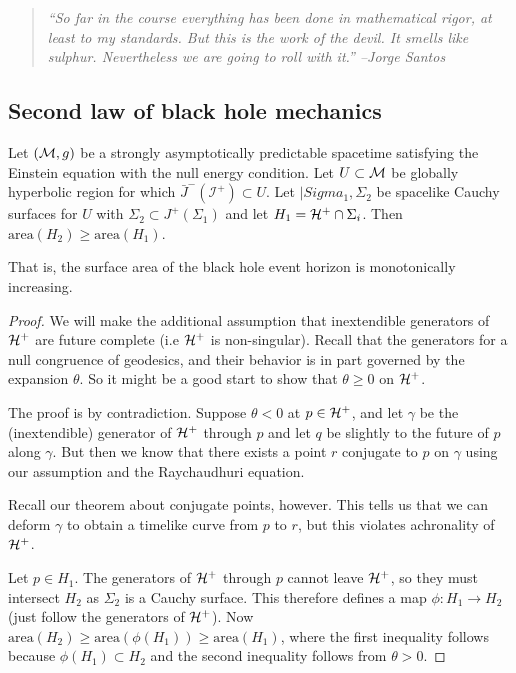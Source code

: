\begin{quote}
    \textit{``So far in the course everything has been done in mathematical rigor, at least to my standards. But this is the work of the devil. It smells like sulphur. Nevertheless we are going to roll with it.'' --Jorge Santos}
\end{quote}
\subsection*{Second law of black hole mechanics}
\begin{thm}[Hawking 1972]
    Let $(\mathcal{M},g)$ be a strongly asymptotically predictable spacetime satisfying the Einstein equation with the null energy condition. Let $U\subset \mathcal{M}$ be globally hyperbolic region for which $\bar J^-(\mathcal{I}^+)\subset U$.  Let $|Sigma_1,\Sigma_2$ be spacelike Cauchy surfaces for $U$ with $\Sigma_2 \subset J^+(\Sigma_1)$ and let $H_1=\mathcal H^+ \cap \Sigma_i$. Then $\text{area}(H_2) \geq \text{area}(H_1)$.
\end{thm}
That is, the surface area of the black hole event horizon is monotonically increasing.
\begin{proof}
    We will make the additional assumption that inextendible generators of $\mathcal H^+$ are future complete (i.e $\mathcal H^+$ is non-singular). Recall that the generators for a null congruence of geodesics, and their behavior is in part governed by the expansion $\theta$. So it might be a good start to show that $\theta \geq 0$ on $\mathcal H^+$.
    
    The proof is by contradiction. Suppose $\theta < 0$ at $p\in \mathcal H^+$, and let $\gamma$ be the (inextendible) generator of $\mathcal H^+$ through $p$ and let $q$ be slightly to the future of $p$ along $\gamma$. But then we know that there exists a point $r$ conjugate to $p$ on $\gamma$ using our assumption and the Raychaudhuri equation.
    
    Recall our theorem about conjugate points, however. %
    This tells us that we can deform $\gamma$ to obtain a timelike curve from $p$ to $r$, but this violates achronality of $\mathcal H^+$.
    
    Let $p\in H_1$. The generators of $\mathcal H^+$ through $p$ cannot leave $\mathcal H^+$, so they must intersect $H_2$ as $\Sigma_2$ is a Cauchy surface. This therefore defines a map $\phi:H_1 \to H_2$ (just follow the generators of $\mathcal H^+$). Now $\text{area}(H_2) \geq \text{area}(\phi(H_1)) \geq \text{area}(H_1)$, where the first inequality follows because $\phi(H_1) \subset H_2$ and the second inequality follows from $\theta >0$.
\end{proof}

